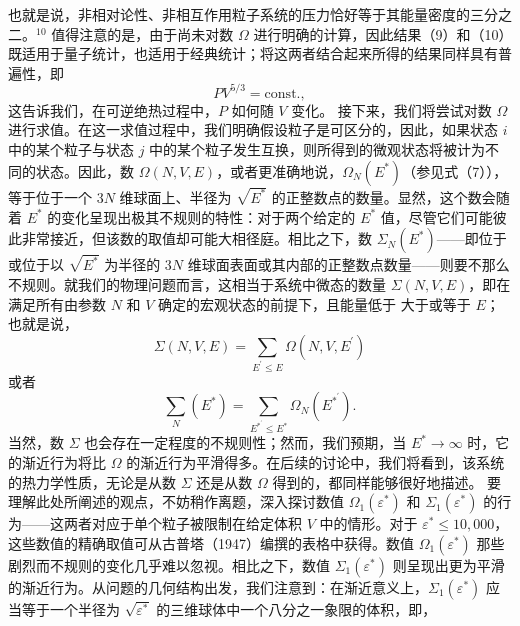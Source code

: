 也就是说，非相对论性、非相互作用粒子系统的压力恰好等于其能量密度的三分之二。\(^{10}\) 值得注意的是，由于尚未对数 \(\Omega\) 进行明确的计算，因此结果（9）和（10）既适用于量子统计，也适用于经典统计；将这两者结合起来所得的结果同样具有普遍性，即
\begin{equation}\tag{1.3.30}\label{eq:1.3.30}
P V ^{5 / 3} = \mathrm { c o n s t . } ,
\end{equation}
这告诉我们，在可逆绝热过程中，\(P\) 如何随 \(V\) 变化。
接下来，我们将尝试对数 \(\Omega\) 进行求值。在这一求值过程中，我们明确假设粒子是可区分的，因此，如果状态 \(i\) 中的某个粒子与状态 \(j\) 中的某个粒子发生互换，则所得到的微观状态将被计为不同的状态。因此，数 \(\Omega(N,V,E)\)，或者更准确地说，\(\Omega_{N}(E^{*})\)（参见式（7）），等于位于一个 \(3N\) 维球面上、半径为 \(\sqrt{E^{*}}\) 的正整数点的数量。显然，这个数会随着 \(E^{*}\) 的变化呈现出极其不规则的特性：对于两个给定的 \(E^{*}\) 值，尽管它们可能彼此非常接近，但该数的取值却可能大相径庭。相比之下，数 \(\Sigma_{N}(E^{*})\)——即位于或位于以 \(\sqrt{E^{*}}\) 为半径的 \(3N\) 维球面表面或其内部的正整数点数量——则要不那么不规则。就我们的物理问题而言，这相当于系统中微态的数量 \(\Sigma(N,V,E)\)，即在满足所有由参数 \(N\) 和 \(V\) 确定的宏观状态的前提下，且能量低于
大于或等于 \(E\)；也就是说，
\begin{equation}\tag{1.3.31}\label{eq:1.3.31}
\Sigma ( N , V , E ) = \sum _ { E ^{\prime} \leq E } \Omega ( N , V , E ^{\prime} )
\end{equation}
或者
\begin{equation}\tag{1.3.32}\label{eq:1.3.32}
\sum _ { N } ( E ^{*} ) = \sum _ { E ^{* ^ { \prime} } \leq E ^{*} } \Omega _ { N } ( E ^{* ^ { \prime} } ) .
\end{equation}
当然，数 \(\Sigma\) 也会存在一定程度的不规则性；然而，我们预期，当 \(E^{*} \rightarrow \infty\) 时，它的渐近行为将比 \(\Omega\) 的渐近行为平滑得多。在后续的讨论中，我们将看到，该系统的热力学性质，无论是从数 \(\Sigma\) 还是从数 \(\Omega\) 得到的，都同样能够很好地描述。
要理解此处所阐述的观点，不妨稍作离题，深入探讨数值 \(\Omega_{1}(\varepsilon^{*})\) 和 \(\Sigma_{1}(\varepsilon^{*})\) 的行为——这两者对应于单个粒子被限制在给定体积 \(V\) 中的情形。对于 \(\varepsilon^{*} \leq 10,000\)，这些数值的精确取值可从古普塔（1947）编撰的表格中获得。数值 \(\Omega_{1}(\varepsilon^{*})\) 那些剧烈而不规则的变化几乎难以忽视。相比之下，数值 \(\Sigma_{1}(\varepsilon^{*})\) 则呈现出更为平滑的渐近行为。从问题的几何结构出发，我们注意到：在渐近意义上，\(\Sigma_{1}(\varepsilon^{*})\) 应当等于一个半径为 \(\sqrt{\varepsilon^{*}}\) 的三维球体中一个八分之一象限的体积，即，
